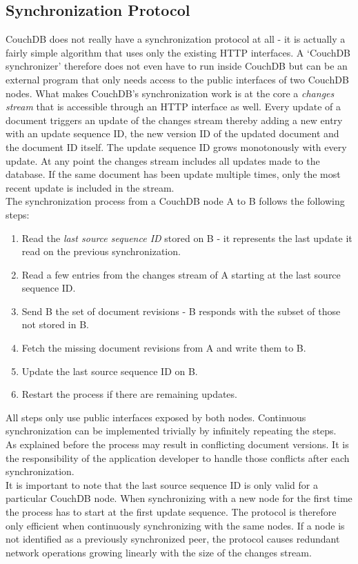 \subsection{Synchronization Protocol}
\label{sec:couchdb.protocol}
CouchDB does not really have a synchronization protocol at all - it is actually a fairly simple algorithm that uses only the existing HTTP interfaces.
A `CouchDB synchronizer' therefore does not even have to run inside CouchDB but can be an external program that only needs access to the public interfaces of two CouchDB nodes.
What makes CouchDB's synchronization work is at the core a \emph{changes stream} that is accessible through an HTTP interface as well.
Every update of a document triggers an update of the changes stream thereby adding a new entry with an update sequence ID, the new version ID of the updated document and the document ID itself.
The update sequence ID grows monotonously with every update.
At any point the changes stream includes all updates made to the database.
If the same document has been update multiple times, only the most recent update is included in the stream.\\

The synchronization process from a CouchDB node A to B follows the following steps:

\begin{enumerate}
\item Read the \emph{last source sequence ID} stored on B - it represents the last update it read on the previous synchronization.
\item Read a few entries from the changes stream of A starting at the last source sequence ID.
\item Send B the set of document revisions - B responds with the subset of those not stored in B.
\item Fetch the missing document revisions from A and write them to B.
\item Update the last source sequence ID on B.
\item Restart the process if there are remaining updates.
\end{enumerate}

All steps only use public interfaces exposed by both nodes.
Continuous synchronization can be implemented trivially by infinitely repeating the steps.\\
As explained before the process may result in conflicting document versions.
It is the responsibility of the application developer to handle those conflicts after each synchronization.\\
It is important to note that the last source sequence ID is only valid for a particular CouchDB node.
When synchronizing with a new node for the first time the process has to start at the first update sequence.
The protocol is therefore only efficient when continuously synchronizing with the same nodes.
If a node is not identified as a previously synchronized peer, the protocol causes redundant network operations growing linearly with the size of the changes stream.

